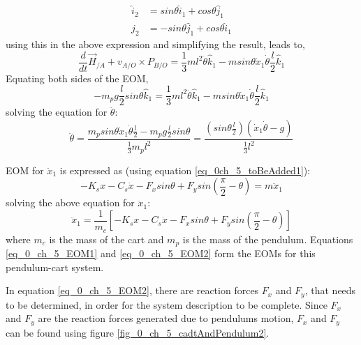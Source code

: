 \begin{align*}
	\hat{i}_{2} &= sin\theta \hat{i}_{1} + cos \theta \hat{j}_{1} \\
	\hat{j}_{2} &= -sin \theta \hat{j}_{1} + cos \theta \hat{i}_{1}
\end{align*}
using this in the above expression and simplifying the result, leads to,
\begin{equation}
\frac{d}{dt}\vec{H}_{/A}  + v_{A/O} \times P_{B/O} = \frac{1}{3}m l ^{2} \ddot{\theta} \hat{k}_{1} - m sin\theta \dot{x}_{1} \dot{\theta} \frac{l}{2} \hat{k}_{1} 
\end{equation}
Equating both sides of the EOM,
\begin{equation*}
	- m_{p} g \frac{l}{2} sin\theta \hat{k}_{1} = \frac{1}{3}m l ^{2} \ddot{\theta} \hat{k}_{1} - m sin\theta \dot{x}_{1} \dot{\theta} \frac{l}{2} \hat{k}_{1}
\end{equation*}
solving the equation for $\ddot{\theta}$:
\begin{equation} \label{eq_0_ch_5_EOM1}
	\ddot{\theta} = \frac{m_{p} sin\theta \dot{x}_{1} \dot{\theta} \frac{l}{2} - m_{p} g \frac{l}{2} sin\theta}{\frac{1}{3}m_{p} l ^{2}} = \frac{\left(sin\theta \frac{l}{2}\right)  \left(\dot{x}_{1} \dot{\theta} - g\right) }{\frac{1}{3} l ^{2}}
\end{equation}

EOM for $\ddot{x}_{1}$ is expressed as (using equation \eqref{eq_0ch_5_toBeAdded1}):
\begin{equation}
	-K_{s}x - C_{s}\dot{x} - F_{x} sin\theta + F_{y} sin(\frac{\pi}{2} - \theta) = m \ddot{x}_{1}
\end{equation}
solving the above equation for $\ddot{x}_{1}$:
\begin{equation}\label{eq_0_ch_5_EOM2}
	\ddot{x}_{1} = \frac{1}{m_{c}} \left[	-K_{s}x - C_{s}\dot{x} - F_{x} sin\theta + F_{y} sin(\frac{\pi}{2} - \theta)\right]
\end{equation}
where $m_{c}$ is the mass of the cart and $m_{p}$ is the mass of the pendulum. Equations \eqref{eq_0_ch_5_EOM1} and \eqref{eq_0_ch_5_EOM2} form the EOMs for this pendulum-cart system.

In equation \eqref{eq_0_ch_5_EOM2}, there are reaction forces $F_{x}$ and $F_{y}$, that needs to be determined, in order for the system description to be complete. Since $F_{x}$ and $F_{y}$ are the reaction forces generated due to pendulums motion, $F_{x}$ and $F_{y}$ can be found using figure \ref{fig_0_ch_5_cadtAndPendulum2}. 

